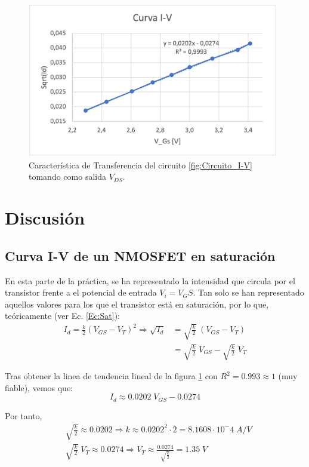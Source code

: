 \begin{figure}
    \centering
    \includegraphics[width=11cm]{Imágenes 05/CurvaI-V_Exp.png}
    \caption{Característica de Transferencia del circuito \ref{fig:Circuito_I-V} tomando como salida $V_{DS}$.}
    \label{fig:CurvaI-V_Exp}
\end{figure}


\section{Discusión}

\subsection{Curva I-V de un NMOSFET en saturación}

En esta parte de la práctica, se ha representado la intensidad que circula por el transistor frente a el potencial de entrada $V_i=V_GS$. Tan solo se han representado aquellos valores para los que el transistor está en saturación, por lo que, teóricamente (ver Ec. \ref{Ec:Sat}):
\begin{equation}\begin{split}
    I_d = \frac{k}{2}(V_{GS}-V_T)^2 \Longrightarrow \sqrt{I_d} & = \sqrt{\frac{k}{2}}\;(V_{GS}-V_T)\\
     & = \sqrt{\frac{k}{2}}\;V_{GS} - \sqrt{\frac{k}{2}}\;V_T
\end{split}\end{equation}

Tras obtener la linea de tendencia lineal de la figura \ref{fig:CurvaI-V_Exp} con $R^2 = 0.993 \approx 1$ (muy fiable), vemos que:
\begin{equation}
    I_d \approx 0.0202 \;V_{GS} - 0.0274
\end{equation}

Por tanto,
\begin{equation}
\begin{split}
    & \sqrt{\frac{k}{2}} \approx 0.0202 \Longrightarrow k \approx 0.0202^2 \cdot 2 = 8.1608\cdot 10^-4 \; A/V\\
    & \sqrt{\frac{k}{2}} \; V_T \approx 0.0274 \Longrightarrow V_T \approx \frac{0.0274}{\sqrt{\frac{k}{2}}} = 1.35\;V
\end{split}
\end{equation}

